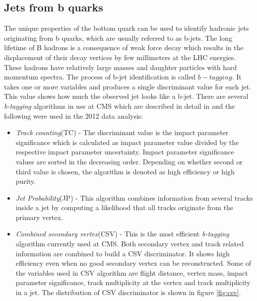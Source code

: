 \subsection{Jets from b quarks}
\label{sec:btagging}

The unique properties of the bottom quark can be used to identify hadronic jets originating from b quarks, which are usually referred to as b-jets. The long lifetime of B hadrons is a consequence of weak force decay which results in the displacement of their decay vertices by few millimeters at the LHC energies. These hadrons have relatively large masses and daughter particles with hard momentum spectra. The process of b-jet identification is called $b-tagging$. It takes one or more variables and produces a single discriminant value for each jet. This value shows how much the observed jet looks like a b-jet. There are several \textit{b-tagging} algorithms in use at CMS which are described in detail in \cite{Chatrchyan:2012jua} and the following were used in the 2012 data analysis:
\begin{itemize}
	\item \textit{Track counting}(TC) - The discriminant value is the impact parameter significance which is calculated as impact parameter value divided by the respective impact parameter uncertainty. Impact parameter significance values are sorted in the decreasing order. Depending on whether second or third value is chosen, the algorithm is denoted as high efficiency or high purity. 
	\item \textit{Jet Probability}(JP) - This algorithm combines information from several tracks inside a jet by computing a likelihood that all tracks originate from the primary vertex.  
	\item \textit{Combined secondary vertex}(CSV) - This is the most efficient \textit{b-tagging} algorithm currently used at CMS. Both secondary vertex and track related information are combined to build a CSV discriminator. It shows high efficiency even when no good secondary vertex can be reconstructed. Some of the variables used in CSV algorithm are flight distance, vertex mass, impact parameter significance, track multiplicity at the vertex and track multiplicity in a jet. The distribution of CSV discriminator is shown in figure \ref{fig:csv}.
\end{itemize}
